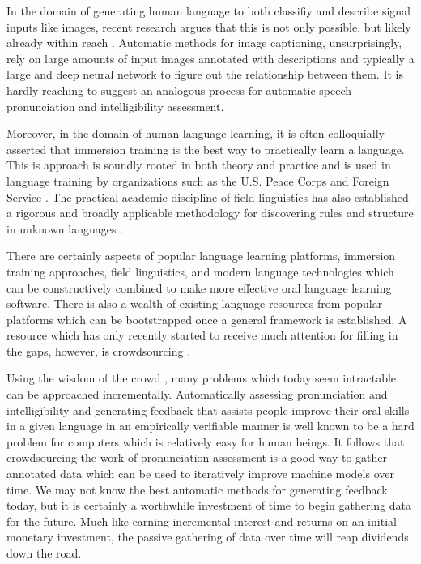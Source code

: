 In the domain of generating human language to both classifiy and describe signal inputs like images, recent research argues that this is not only possible, but likely already within reach \cite{reed2016learning} \cite{tran2016rich}. Automatic methods for image captioning, unsurprisingly, rely on large amounts of input images annotated with descriptions and typically a large and deep neural network to figure out the relationship between them. It is hardly reaching to suggest an analogous process for automatic speech pronunciation and intelligibility assessment. 

Moreover, in the domain of human language learning, it is often colloquially asserted that immersion training is the best way to practically learn a language. This is approach is soundly rooted in both theory and practice and is used in language training by organizations such as the U.S. Peace Corps and Foreign Service \cite{swain1998interaction} \cite{genesee1987learning} \cite{johnson1997immersion} \cite{howard2005second} \cite{leeds1990notes}. The practical academic discipline of field linguistics has also established a rigorous and broadly applicable methodology for discovering rules and structure in unknown languages \cite{seuren1966grammar} \cite{crowley2007field} \cite{lawler1998using}. 

There are certainly aspects of popular language learning platforms, immersion training approaches, field linguistics, and modern language technologies which can be constructively combined to make more effective oral language learning software. There is also a wealth of existing language resources from popular platforms which can be bootstrapped once a general framework is established. A resource which has only recently started to receive much attention for filling in the gaps, however, is crowdsourcing \cite{eskenazi2013crowdsourcing} \cite{parent2011speaking} \cite{callison2010creating}.

Using the wisdom of the crowd \cite{surowiecki2005wisdom}, many problems which today seem intractable can be approached incrementally. Automatically assessing pronunciation and intelligibility and generating feedback that assists people improve their oral skills in a given language in an empirically verifiable manner is well known to be a hard problem for computers which is relatively easy for human beings. It follows that crowdsourcing the work of pronunciation assessment is a good way to gather annotated data which can be used to iteratively improve machine models over time. We may not know the best automatic methods for generating feedback today, but it is certainly a worthwhile investment of time to begin gathering data for the future. Much like earning incremental interest and returns on an initial monetary investment, the passive gathering of data over time will reap dividends down the road.




